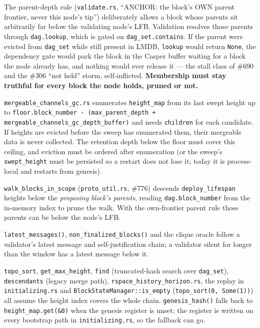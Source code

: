 \documentclass[11pt]{article}
\newcommand{\code}[1]{\texttt{#1}}
\begin{document}
\begin{description}[leftmargin=1.5em,style=nextline]
\item[Late blocks from lagging validators.] The parent-depth rule
  (\code{validate.rs}, ``ANCHOR: the block's OWN parent frontier, never this
  node's tip'') deliberately allows a block whose parents sit arbitrarily far
  below the validating node's LFB. Validation resolves those parents through
  \code{dag.lookup}, which is gated on \code{dag\_set.contains}. If the parent
  were evicted from \code{dag\_set} while still present in LMDB, \code{lookup}
  would return \code{None}, the dependency gate would park the block in the
  Casper buffer waiting for a block the node already has, and nothing would
  ever release it --- the stall class of \#690 and the \#306 ``not held'' storm,
  self-inflicted. \textbf{Membership must stay truthful for every block the
  node holds, pruned or not.}
\item[Mergeable-channel GC.] \code{mergeable\_channels\_gc.rs} enumerates
  \code{height\_map} from its last swept height up to
  \code{floor.block\_number - (max\_parent\_depth + mergeable\_channels\_gc\_depth\_buffer)}
  and needs \code{children} for each candidate. If heights are evicted before
  the sweep has enumerated them, their mergeable data is never collected. The
  retention depth below the floor must cover this ceiling, and eviction must be
  ordered after enumeration (or the sweep's \code{swept\_height} must be
  persisted so a restart does not lose it; today it is process-local and
  restarts from genesis).
\item[Repeat-deploy scope walks.] \code{walk\_blocks\_in\_scope}
  (\code{proto\_util.rs}, \#776) descends \code{deploy\_lifespan} heights
  below the \emph{proposing block's parents}, reading
  \code{dag.block\_number} from the in-memory index to prune the walk. With
  the own-frontier parent rule those parents can be below the node's LFB.
\item[Silent validators.] \code{latest\_messages()},
  \code{non\_finalized\_blocks()} and the clique oracle follow a validator's
  latest message and self-justification chain; a validator silent for longer
  than the window has a latest message below it.
\item[Block API, history horizon, replay.] \code{topo\_sort},
  \code{get\_max\_height}, \code{find} (truncated-hash search over
  \code{dag\_set}), \code{descendants} (legacy merge path),
  \code{rspace\_history\_horizon.rs}, the replay in \code{initializing.rs}
  and \code{BlockStateManager::is\_empty} (\code{topo\_sort(0, Some(1))}) all
  assume the height index covers the whole chain. \code{genesis\_hash()}
  falls back to \code{height\_map.get(\&0)} when the genesis register is
  unset; the register is written on every bootstrap path in
  \code{initializing.rs}, so the fallback can go.
\end{description}
\end{document}
